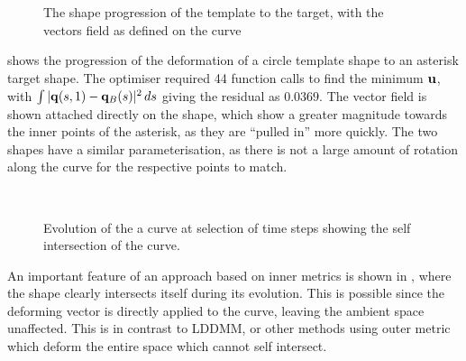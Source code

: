 \documentclass[a4paper, 12pt]{article}
\begin{document}
\begin{figure}[!h]
  \centering
  \\
  \\
  \caption{The shape progression of the template to the target, with the vectors
  field as defined on the curve}
  \label{fig:vectors}
\end{figure}
 shows the progression of the deformation of a circle template
shape to an asterisk target shape. The optimiser required 44 function calls to
find the minimum $\mathbf{u}$, with $\int \vert \mathbf{q}(s,1) - \mathbf{q}_B(s)
\vert^2\,ds$ giving the residual as $0.0369$. The vector field is shown attached
directly on the shape, which show a greater magnitude towards the inner points
of the asterisk, as they are ``pulled in'' more quickly. The two shapes have a
similar parameterisation, as there is not a large amount of rotation along the
curve for the respective points to match.

\begin{figure}[!h]
  \centering
  \\
  \caption{Evolution of the a curve at selection of time steps showing the self
    intersection of the curve.}
\label{fig:intersection}
\end{figure}
An important feature of an approach based on inner metrics is shown in
, where the shape clearly intersects itself during its
evolution. This is possible since the deforming vector is directly applied to
the curve, leaving the ambient space unaffected. This is in contrast to LDDMM,
or other methods using outer metric which deform the entire space which cannot
self intersect.
\end{document}
